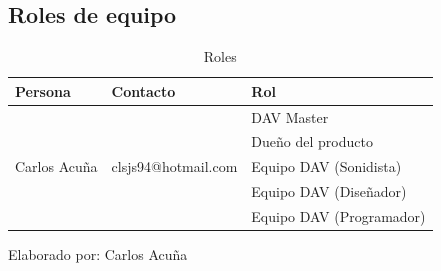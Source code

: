 \documentclass[a4paper, openright, 12pt]{report}
\begin{document}
\subsection*{Roles de equipo}

\begin{table}[htb]
\centering
\begin{tabular}{|l|l|l|}
\hline
\textbf{Persona} & \textbf{Contacto} & \textbf{Rol}\\ \hline
\multirow{5}{2cm}{Carlos Acuña} & \multirow{5}{4cm}{clsjs94@hotmail.com}  & DAV Master\\ \cline{3-3}
& & Dueño del producto \\ \cline{3-3}
& & Equipo DAV (Sonidista) \\ \cline{3-3}
& & Equipo DAV (Diseñador) \\ \cline{3-3}
& & Equipo DAV (Programador) \\ \cline{1-3}
\end{tabular}
\caption{Roles}
\end{table}
\begin{center}
Elaborado por: Carlos Acuña
\end{center}
\end{document}
